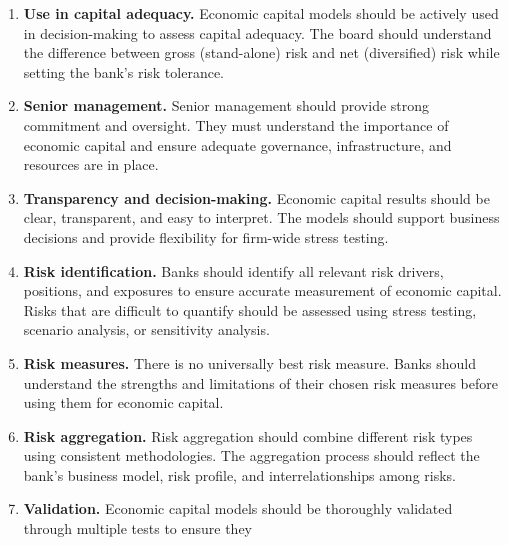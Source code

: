 

\begin{enumerate}
\item[\textcolor{rust}{\sffamily\bfseries 1.}] \textbf{Use in capital adequacy.}
Economic capital models should be actively used in decision-making to assess
capital adequacy. The board should understand the difference between gross
(stand-alone) risk and net (diversified) risk while setting the bank's risk
tolerance.
\item[\textcolor{rust}{\sffamily\bfseries 2.}] \textbf{Senior management.} Senior
management should provide strong commitment and oversight. They must understand the
importance of economic capital and ensure adequate governance, infrastructure, and
resources are in place.
\item[\textcolor{rust}{\sffamily\bfseries 3.}] \textbf{Transparency and
decision-making.} Economic capital results should be clear, transparent, and easy
to interpret. The models should support business decisions and provide flexibility
for firm-wide stress testing.
\item[\textcolor{rust}{\sffamily\bfseries 4.}] \textbf{Risk identification.} Banks
should identify all relevant risk drivers, positions, and exposures to ensure
accurate measurement of economic capital. Risks that are difficult to quantify
should be assessed using stress testing, scenario analysis, or sensitivity
analysis.
\item[\textcolor{rust}{\sffamily\bfseries 5.}] \textbf{Risk measures.} There is no
universally best risk measure. Banks should understand the strengths and
limitations of their chosen risk measures before using them for economic capital.
\item[\textcolor{rust}{\sffamily\bfseries 6.}] \textbf{Risk aggregation.} Risk
aggregation should combine different risk types using consistent methodologies. The
aggregation process should reflect the bank's business model, risk profile, and
interrelationships among risks.
\item[\textcolor{rust}{\sffamily\bfseries 7.}] \textbf{Validation.} Economic
capital models should be thoroughly validated through multiple tests to ensure they

\end{enumerate}

